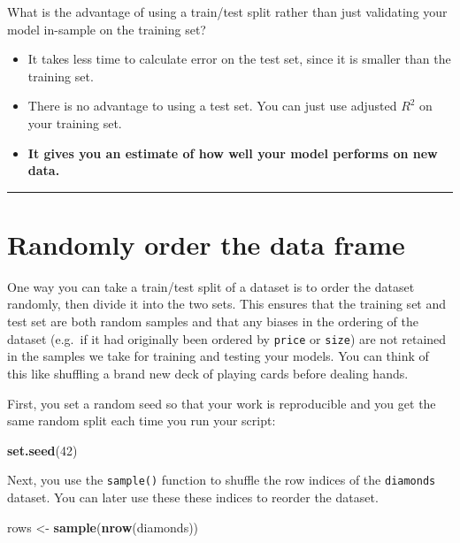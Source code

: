 \documentclass[
]{book}
\newenvironment{Shaded}{\begin{snugshade}}{\end{snugshade}}
\newcommand{\DecValTok}[1]{\textcolor[rgb]{0.00,0.00,0.81}{#1}}
\newcommand{\KeywordTok}[1]{\textcolor[rgb]{0.13,0.29,0.53}{\textbf{#1}}}
\newcommand{\NormalTok}[1]{#1}
\newcommand{\StringTok}[1]{\textcolor[rgb]{0.31,0.60,0.02}{#1}}
\begin{document}
What is the advantage of using a train/test split rather than just validating your model in-sample on the training set?

\begin{itemize}
\item
  It takes less time to calculate error on the test set, since it is smaller than the training set.
\item
  There is no advantage to using a test set. You can just use adjusted \(R^2\) on your training set.
\item
  \textbf{It gives you an estimate of how well your model performs on new data.}
\end{itemize}

\begin{center}\rule{0.5\linewidth}{0.5pt}\end{center}

\hypertarget{randomly-order-the-data-frame}{%
\section{Randomly order the data frame}\label{randomly-order-the-data-frame}}

One way you can take a train/test split of a dataset is to order the dataset randomly, then divide it into the two sets. This ensures that the training set and test set are both random samples and that any biases in the ordering of the dataset (e.g.~if it had originally been ordered by \texttt{price} or \texttt{size}) are not retained in the samples we take for training and testing your models. You can think of this like shuffling a brand new deck of playing cards before dealing hands.

First, you set a random seed so that your work is reproducible and you get the same random split each time you run your script:

\begin{Shaded}
\begin{Highlighting}[]
\KeywordTok{set.seed}\NormalTok{(}\DecValTok{42}\NormalTok{)}
\end{Highlighting}
\end{Shaded}

Next, you use the \texttt{sample()} function to shuffle the row indices of the \texttt{diamonds} dataset. You can later use these these indices to reorder the dataset.

\begin{Shaded}
\begin{Highlighting}[]
\NormalTok{rows <-}\StringTok{ }\KeywordTok{sample}\NormalTok{(}\KeywordTok{nrow}\NormalTok{(diamonds))}
\end{Highlighting}
\end{Shaded}
\end{document}
